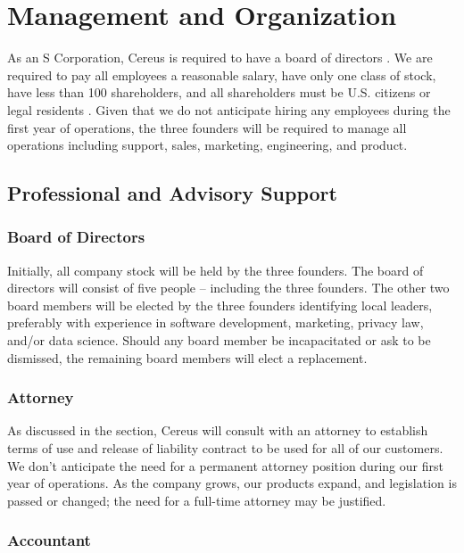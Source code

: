 {\let\cleardoublepage\relax \chapter*{Management and Organization}}

As an S Corporation, Cereus is required to have a board of directors \cite{UpCounsel.2020}. We are required to pay all employees a reasonable salary, have only one class of stock, have less than 100 shareholders, and all shareholders must be U.S. citizens or legal residents \cite{wave.2019}. Given that we do not anticipate hiring any employees during the first year of operations, the three founders will be required to manage all operations including support, sales, marketing, engineering, and product. 

\section{Professional and Advisory Support}

\subsection{Board of Directors}

Initially, all company stock will be held by the three founders. The board of directors will consist of five people -- including the three founders. The other two board members will be elected by the three founders identifying local leaders, preferably with experience in software development, marketing, privacy law, and/or data science. Should any board member be incapacitated or ask to be dismissed, the remaining board members will elect a replacement.

\subsection{Attorney}

As discussed in the  section, Cereus will consult with an attorney to establish terms of use and release of liability contract to be used for all of our customers. We don't anticipate the need for a permanent attorney position during our first year of operations. As the company grows, our products expand, and legislation is passed or changed; the need for a full-time attorney may be justified. 

\subsection{Accountant}

